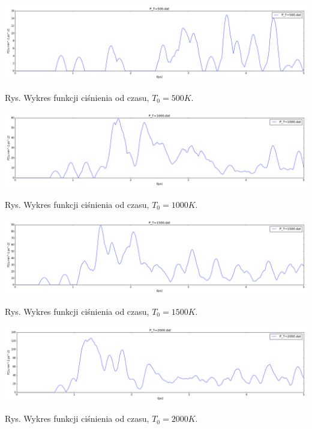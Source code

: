\documentclass[polish,polish,a4paper,11pt]{article}
\begin{document}
\begin{center}
\includegraphics[scale=0.3]{../Data/P_T=500.png}
\end{center}
\begin{center}
Rys.  Wykres funkcji ciśnienia od czasu, $T_0 = 500K$.
\end{center}
\begin{center}
\includegraphics[scale=0.3]{../Data/P_T=1000.png}
\end{center}
\begin{center}
Rys.  Wykres funkcji ciśnienia od czasu, $T_0 = 1000K$.
\end{center}
\begin{center}
\includegraphics[scale=0.3]{../Data/P_T=1500.png}
\end{center}
\begin{center}
Rys.  Wykres funkcji ciśnienia od czasu, $T_0 = 1500K$.
\end{center}
\begin{center}
\includegraphics[scale=0.3]{../Data/P_T=2000.png}
\end{center}
\begin{center}
Rys.  Wykres funkcji ciśnienia od czasu, $T_0 = 2000K$.
\end{center}
\end{document}
